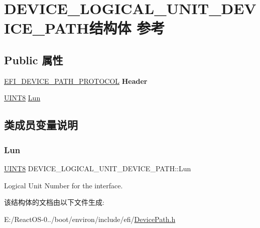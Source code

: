 \hypertarget{struct_d_e_v_i_c_e___l_o_g_i_c_a_l___u_n_i_t___d_e_v_i_c_e___p_a_t_h}{}\section{D\+E\+V\+I\+C\+E\+\_\+\+L\+O\+G\+I\+C\+A\+L\+\_\+\+U\+N\+I\+T\+\_\+\+D\+E\+V\+I\+C\+E\+\_\+\+P\+A\+T\+H结构体 参考}
\label{struct_d_e_v_i_c_e___l_o_g_i_c_a_l___u_n_i_t___d_e_v_i_c_e___p_a_t_h}
\subsection*{Public 属性}
\begin{DoxyCompactItemize}
\item 
\mbox{\label{struct_d_e_v_i_c_e___l_o_g_i_c_a_l___u_n_i_t___d_e_v_i_c_e___p_a_t_h_ab12a7e0272105a0c3cfc82c46cc00669}} 
\hyperlink{struct_e_f_i___d_e_v_i_c_e___p_a_t_h___p_r_o_t_o_c_o_l}{E\+F\+I\+\_\+\+D\+E\+V\+I\+C\+E\+\_\+\+P\+A\+T\+H\+\_\+\+P\+R\+O\+T\+O\+C\+OL} {\bfseries Header}
\item 
\hyperlink{_processor_bind_8h_ab27e9918b538ce9d8ca692479b375b6a}{U\+I\+N\+T8} \hyperlink{struct_d_e_v_i_c_e___l_o_g_i_c_a_l___u_n_i_t___d_e_v_i_c_e___p_a_t_h_ae1a1abc81334750b8c382fe9a6137231}{Lun}
\end{DoxyCompactItemize}


\subsection{类成员变量说明}
\mbox{\label{struct_d_e_v_i_c_e___l_o_g_i_c_a_l___u_n_i_t___d_e_v_i_c_e___p_a_t_h_ae1a1abc81334750b8c382fe9a6137231}} 
\subsubsection{\texorpdfstring{Lun}{Lun}}
{\footnotesize\ttfamily \hyperlink{_processor_bind_8h_ab27e9918b538ce9d8ca692479b375b6a}{U\+I\+N\+T8} D\+E\+V\+I\+C\+E\+\_\+\+L\+O\+G\+I\+C\+A\+L\+\_\+\+U\+N\+I\+T\+\_\+\+D\+E\+V\+I\+C\+E\+\_\+\+P\+A\+T\+H\+::\+Lun}

Logical Unit Number for the interface. 

该结构体的文档由以下文件生成\+:\begin{DoxyCompactItemize}
\item 
E\+:/\+React\+O\+S-\/0../boot/environ/include/efi/\hyperlink{_device_path_8h}{Device\+Path.\+h}\end{DoxyCompactItemize}
